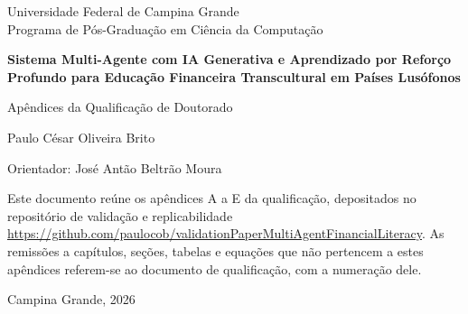 \documentclass[12pt,a4paper]{report}
\begin{document}
\begin{titlepage}
  \centering
  {\large Universidade Federal de Campina Grande\\
  Programa de Pós-Graduação em Ciência da Computação\par}
  \vspace{3cm}
  {\Large\bfseries Sistema Multi-Agente com IA Generativa e Aprendizado por Reforço Profundo para Educação Financeira Transcultural em Países Lusófonos\par}
  \vspace{1cm}
  {\large Apêndices da Qualificação de Doutorado\par}
  \vspace{2cm}
  {\large Paulo César Oliveira Brito\par}
  \vspace{0.5cm}
  {Orientador: José Antão Beltrão Moura\par}
  \vfill
  \begin{minipage}{0.9\textwidth}
    \small
    Este documento reúne os apêndices A a E da qualificação, depositados no repositório de validação e replicabilidade \url{https://github.com/paulocob/validationPaperMultiAgentFinancialLiteracy}. As remissões a capítulos, seções, tabelas e equações que não pertencem a estes apêndices referem-se ao documento de qualificação, com a numeração dele.
  \end{minipage}
  \vspace{1cm}

  {Campina Grande, 2026\par}
\end{titlepage}

\tableofcontents

\appendix




\end{document}

